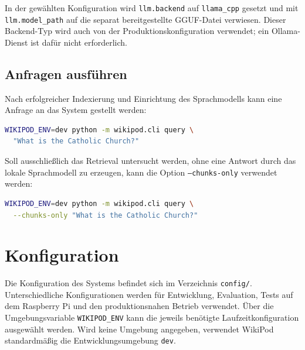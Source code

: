 In der gewählten Konfiguration wird \texttt{llm.backend} auf
\texttt{llama\_cpp} gesetzt und mit \texttt{llm.model\_path} auf die separat
bereitgestellte GGUF-Datei verwiesen. Dieser Backend-Typ wird auch von der
Produktionskonfiguration verwendet; ein Ollama-Dienst ist dafür nicht erforderlich.

\subsection{Anfragen ausführen}

Nach erfolgreicher Indexierung und Einrichtung des Sprachmodells kann eine
Anfrage an das System gestellt werden:

\par\nopagebreak[4]\smallskip
\noindent\begin{minipage}[t]{\linewidth}
\vspace{0pt}
\begin{lstlisting}[language=bash]
WIKIPOD_ENV=dev python -m wikipod.cli query \
  "What is the Catholic Church?"
\end{lstlisting}
\end{minipage}\par\smallskip

\par\smallskip
\noindent\begin{minipage}{\linewidth}
Soll ausschließlich das Retrieval untersucht werden, ohne eine Antwort durch
das lokale Sprachmodell zu erzeugen, kann die Option
\texttt{--chunks-only} verwendet werden:

\par\nopagebreak[4]\smallskip
\noindent\begin{minipage}[t]{\linewidth}
\vspace{0pt}
\begin{lstlisting}[language=bash]
WIKIPOD_ENV=dev python -m wikipod.cli query \
  --chunks-only "What is the Catholic Church?"
\end{lstlisting}
\end{minipage}\par\smallskip
\end{minipage}\par\smallskip

\section{Konfiguration}

Die Konfiguration des Systems befindet sich im Verzeichnis
\texttt{config/}. Unterschiedliche Konfigurationen werden für Entwicklung,
Evaluation, Tests auf dem Raspberry Pi und den produktionsnahen Betrieb
verwendet. Über die Umgebungsvariable \texttt{WIKIPOD\_ENV} kann die jeweils
benötigte Laufzeitkonfiguration ausgewählt werden. Wird keine Umgebung
angegeben, verwendet WikiPod standardmäßig die Entwicklungsumgebung
\texttt{dev}.

